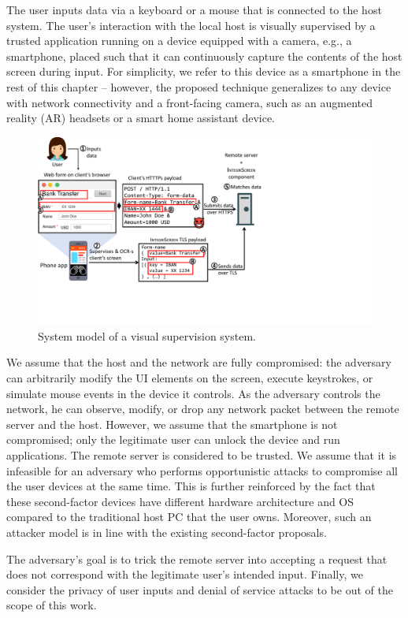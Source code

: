 The user inputs data via a keyboard or a mouse that is connected to the host system. The user's interaction with the local host is visually supervised by a trusted application running on a device equipped with a camera, e.g., a smartphone, placed such that it can continuously capture the contents of the host screen during input. 
For simplicity, we refer to this device as a smartphone in the rest of this chapter -- however, the proposed technique generalizes to any device with network connectivity and a front-facing camera, such as an augmented reality (AR) headsets or a smart home assistant device.

\begin{figure}[t]
	\centering
    \includegraphics[trim={0 3.7cm 11.2cm 0},clip,width=\linewidth]{chapters/IntegriScreen/newImg/overview-vertical.pdf}
	\caption{System model of a visual supervision system.}
	\label{integriscreen:fig:systemModel}
\end{figure}


We assume that the host and the network are fully compromised: the adversary can arbitrarily modify the UI elements on the screen, execute keystrokes, or simulate mouse events in the device it controls. As the adversary controls the network, he can observe, modify, or drop any network packet between the remote server and the host.
However, we assume that the smartphone is not compromised; only the legitimate user can unlock the device and run applications. The remote server is considered to be trusted. 
We assume that it is infeasible for an adversary who performs opportunistic attacks to compromise all the user devices at the same time. This is further reinforced by the fact that these second-factor devices have different hardware architecture and OS compared to the traditional host PC that the user owns. Moreover, such an attacker model is in line with the existing second-factor proposals.

The adversary's goal is to trick the remote server into accepting a request that does not correspond with the legitimate user's intended input.
Finally, we consider the privacy of user inputs and denial of service attacks to be out of the scope of this work.